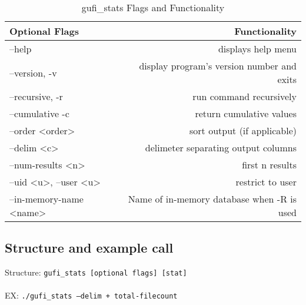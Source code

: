 \begin{table} [h]
\centering
\begin{tabular}{l|r}
Optional Flags & Functionality\\\hline
--help & displays help menu\\
--version, -v & display program's version number and exits \\
--recursive, -r & run command recursively \\
--cumulative -c & return cumulative values \\
--order \textless order\textgreater & sort output (if applicable)\\
--delim \textless c\textgreater & delimeter separating output columns\\
--num-results \textless n\textgreater & first n results \\
--uid \textless u\textgreater, --user \textless u\textgreater & restrict to user \\
--in-memory-name \textless name\textgreater & Name of in-memory database when -R is used
\end{tabular}
\caption{\label{fig:gufi_stats_flags}gufi\_stats Flags and Functionality}
\end{table}

\subsection{Structure and example call}
Structure: \texttt{gufi\_stats [optional flags] [stat] }
\\
\\
EX: \texttt{./gufi\_stats --delim + total-filecount}
